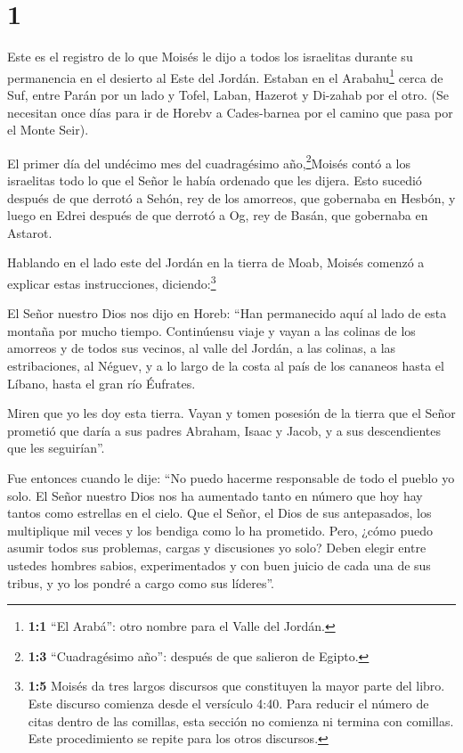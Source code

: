 \hypertarget{section}{%
\section{1}\label{section}}

 Este es el registro de lo que Moisés le dijo a todos los
israelitas durante su permanencia en el desierto al Este del Jordán.
Estaban en el Arabahu\footnote{\textbf{1:1} ``El Arabá'': otro nombre
  para el Valle del Jordán.} cerca de Suf, entre Parán por un lado y
Tofel, Laban, Hazerot y Di-zahab por el otro.  (Se necesitan
once días para ir de Horebv a Cades-barnea por el camino que pasa por el
Monte Seir).

 El primer día del undécimo mes del cuadragésimo
año,\footnote{\textbf{1:3} ``Cuadragésimo año'': después de que salieron
  de Egipto.}Moisés contó a los israelitas todo lo que el Señor le había
ordenado que les dijera.  Esto sucedió después de que
derrotó a Sehón, rey de los amorreos, que gobernaba en Hesbón, y luego
en Edrei después de que derrotó a Og, rey de Basán, que gobernaba en
Astarot.

 Hablando en el lado este del Jordán en la tierra de Moab,
Moisés comenzó a explicar estas instrucciones, diciendo:\footnote{\textbf{1:5}
  Moisés da tres largos discursos que constituyen la mayor parte del
  libro. Este discurso comienza desde el versículo 4:40. Para reducir el
  número de citas dentro de las comillas, esta sección no comienza ni
  termina con comillas. Este procedimiento se repite para los otros
  discursos.}

 El Señor nuestro Dios nos dijo en Horeb: ``Han permanecido
aquí al lado de esta montaña por mucho tiempo.  Continúensu
viaje y vayan a las colinas de los amorreos y de todos sus vecinos, al
valle del Jordán, a las colinas, a las estribaciones, al Néguev, y a lo
largo de la costa al país de los cananeos hasta el Líbano, hasta el gran
río Éufrates.

 Miren que yo les doy esta tierra. Vayan y tomen posesión de
la tierra que el Señor prometió que daría a sus padres Abraham, Isaac y
Jacob, y a sus descendientes que les seguirían''.

 Fue entonces cuando le dije: ``No puedo hacerme responsable
de todo el pueblo yo solo.  El Señor nuestro Dios nos ha
aumentado tanto en número que hoy hay tantos como estrellas en el cielo.
 Que el Señor, el Dios de sus antepasados, los multiplique
mil veces y los bendiga como lo ha prometido.  Pero, ¿cómo
puedo asumir todos sus problemas, cargas y discusiones yo solo?
 Deben elegir entre ustedes hombres sabios, experimentados
y con buen juicio de cada una de sus tribus, y yo los pondré a cargo
como sus líderes''.

